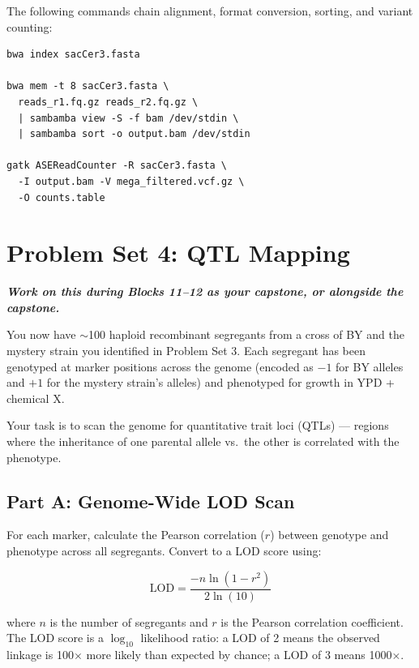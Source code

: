 \begin{tipbox}
The following commands chain alignment, format conversion, sorting, and variant counting:
\begin{lstlisting}
bwa index sacCer3.fasta

bwa mem -t 8 sacCer3.fasta \
  reads_r1.fq.gz reads_r2.fq.gz \
  | sambamba view -S -f bam /dev/stdin \
  | sambamba sort -o output.bam /dev/stdin

gatk ASEReadCounter -R sacCer3.fasta \
  -I output.bam -V mega_filtered.vcf.gz \
  -O counts.table
\end{lstlisting}
\end{tipbox}


\section{Problem Set 4: QTL Mapping}\label{ps:4}

\textit{\textbf{Work on this during Blocks 11--12 as your capstone, or alongside the capstone.}}

You now have $\sim$100 haploid recombinant segregants from a cross of BY and the mystery strain you identified in Problem Set 3. Each segregant has been genotyped at marker positions across the genome (encoded as $-1$ for BY alleles and $+1$ for the mystery strain's alleles) and phenotyped for growth in YPD + chemical X.

Your task is to scan the genome for quantitative trait loci (QTLs) --- regions where the inheritance of one parental allele vs.\ the other is correlated with the phenotype.

\subsection{Part A: Genome-Wide LOD Scan}

For each marker, calculate the Pearson correlation ($r$) between genotype and phenotype across all segregants. Convert to a LOD score using:

\begin{equation}
\text{LOD} = \frac{-n \ln(1 - r^2)}{2 \ln(10)}
\end{equation}

where $n$ is the number of segregants and $r$ is the Pearson correlation coefficient. The LOD score is a $\log_{10}$ likelihood ratio: a LOD of 2 means the observed linkage is 100$\times$ more likely than expected by chance; a LOD of 3 means 1000$\times$.

